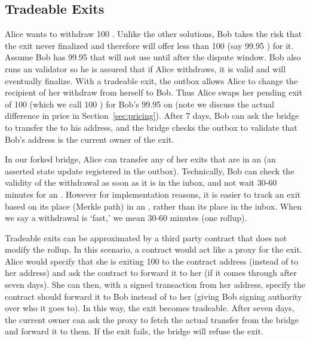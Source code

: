  

\subsection{Tradeable Exits} 
\label{sec:tradeablexits}

Alice wants to withdraw 100 \ethtwo. Unlike the other solutions, Bob takes the risk that the exit never finalized and therefore will offer less than 100 \ethone (say 99.95 \ethone) for it. Assume Bob has 99.95 \ethone that will not use until after the dispute window. Bob also runs an \layertwo validator so he is assured that if Alice withdraws, it is valid and will eventually finalize. With a tradeable exit, the outbox allows Alice to change the recipient of her withdraw from herself to Bob. Thus Alice swaps her pending exit of 100 \ethone (which we call 100 \ethxx) for Bob's 99.95 \ethone on \layerone (note we discuss the actual difference in price in Section~\ref{sec:pricing}). After 7 days, Bob can ask the bridge to transfer the \ethone to his address, and the bridge checks the outbox to validate that Bob's address is the current owner of the exit.

In our forked bridge, Alice can transfer any of her exits that are in an \rblock (\ie an asserted \layertwo state update registered in the outbox). Technically, Bob can check the validity of the withdrawal as soon as it is in the inbox, and not wait 30-60 minutes for an \rblock. However for implementation reasons, it is easier to track an exit based on its place (\ie Merkle path) in an \rblock, rather than its place in the inbox. When we say a withdrawal is `fast,' we mean 30-60 minutes (\ie one \layertwo rollup). 

Tradeable exits can be approximated by a third party \layerone contract that does not modify the rollup. In this scenario, a \layerone contract would act like a proxy for the exit. Alice would specify that she is exiting 100 \ethtwo to the contract address (instead of to her address) and ask the contract to forward it to her (if it comes through after seven days). She can then, with a signed transaction from her address, specify the contract should forward it to Bob instead of to her (giving Bob signing authority over who it goes to). In this way, the exit becomes tradeable. After seven days, the current owner can ask the proxy to fetch the actual transfer from the bridge and forward it to them. If the exit fails, the bridge will refuse the exit. 

